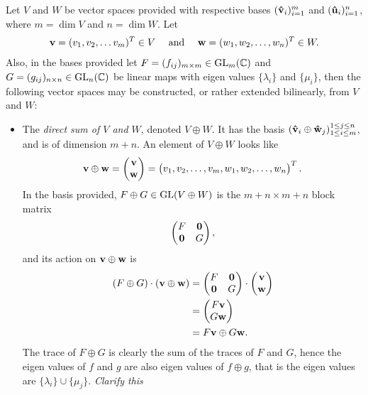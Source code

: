 		Let $V$ and $W$ be vector spaces provided with respective bases $(\mathbf{\hat{v}}_i)_{i=1}^m$ and $(\mathbf{\hat{u}}_i)_{i=1}^n$, where $m = \dim V$ and $n = \dim W$. Let \begin{align*}
			\mathbf{v} = (v_1, v_2, \dots v_m)^T \in V
		\quad \text{ and } \quad 
		\mathbf{w} = (w_1, w_2, \dots, w_n)^T \in W.
	\end{align*}
	Also, in the bases provided let $F=(f_{ij})_{m \times m} \in \text{GL}_m(\mathbb{C})$ and $G = (g_{ij})_{n \times n} \in \text{GL}_n(\mathbb{C})$ be linear maps with eigen values $\{\lambda_i\}$ and $\{\mu_i\}$, then the following vector spaces may be constructed, or rather extended bilinearly, from $V$ and $W$:
		
		\begin{itemize}
			\item The \emph{direct sum of $V$ and $W$}, denoted $V \oplus W$.
				\subitem It has the basis $(\mathbf{\hat{v}}_i \oplus \mathbf{\hat{w}}_j)_{1 \leq i \leq m}^{1 \leq j \leq n}$, and is of dimension $m+n$.
				\subitem An element of $V \oplus W$ looks like \begin{align*}
					\mathbf{v} \oplus \mathbf{w} = \begin{pmatrix}
						\mathbf{v} \\ \mathbf{w}
					\end{pmatrix} = \begin{pmatrix}
					v_1, v_2, \dots, v_m, w_1, w_2, \dots, w_n
					\end{pmatrix}^T.
				\end{align*}
				\subitem In the basis provided, $F \oplus G \in \text{GL}(V \oplus W)$ is the $m+n \times m+n$ block matrix 
				\begin{align*}
					\begin{pmatrix}
						F & \mathbf{0} \\ 
						\mathbf{0} & G
					\end{pmatrix},
				\end{align*}
				and its action on $\mathbf{v} \oplus \mathbf{w}$ is 
				\begin{align*}
					(F \oplus G ) \cdot (\mathbf{v}  \oplus \mathbf{w}) &= \begin{pmatrix}
						F & \mathbf{0} \\ 
						\mathbf{0} & G
					\end{pmatrix} \cdot \begin{pmatrix}
					\mathbf{v} \\ \mathbf{w}
					\end{pmatrix} \\ 
					&= \begin{pmatrix}
					F\mathbf{v} \\ G\mathbf{w}
					\end{pmatrix}  \\ 
					&= F\mathbf{v} \oplus G\mathbf{w}.
				\end{align*}
				\subitem The trace of $F \oplus G$ is clearly the sum of the traces of $F$ and $G$, hence the eigen values of $f$ and $g$ are also eigen values of $f \oplus g$, that is the eigen values are $\{\lambda_i\} \cup \{\mu_j\}$. \textit{Clarify this}
				

\end{itemize}
